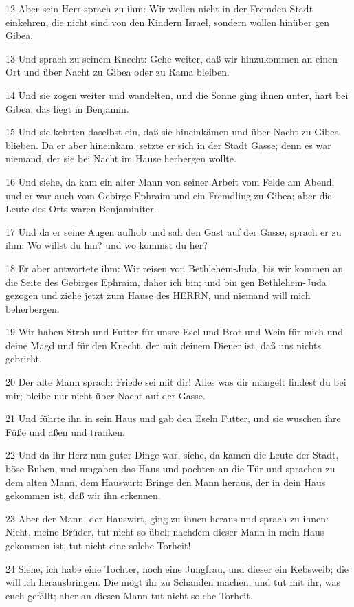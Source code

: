 \par 12 Aber sein Herr sprach zu ihm: Wir wollen nicht in der Fremden Stadt einkehren, die nicht sind von den Kindern Israel, sondern wollen hinüber gen Gibea.
\par 13 Und sprach zu seinem Knecht: Gehe weiter, daß wir hinzukommen an einen Ort und über Nacht zu Gibea oder zu Rama bleiben.
\par 14 Und sie zogen weiter und wandelten, und die Sonne ging ihnen unter, hart bei Gibea, das liegt in Benjamin.
\par 15 Und sie kehrten daselbst ein, daß sie hineinkämen und über Nacht zu Gibea blieben. Da er aber hineinkam, setzte er sich in der Stadt Gasse; denn es war niemand, der sie bei Nacht im Hause herbergen wollte.
\par 16 Und siehe, da kam ein alter Mann von seiner Arbeit vom Felde am Abend, und er war auch vom Gebirge Ephraim und ein Fremdling zu Gibea; aber die Leute des Orts waren Benjaminiter.
\par 17 Und da er seine Augen aufhob und sah den Gast auf der Gasse, sprach er zu ihm: Wo willst du hin? und wo kommst du her?
\par 18 Er aber antwortete ihm: Wir reisen von Bethlehem-Juda, bis wir kommen an die Seite des Gebirges Ephraim, daher ich bin; und bin gen Bethlehem-Juda gezogen und ziehe jetzt zum Hause des HERRN, und niemand will mich beherbergen.
\par 19 Wir haben Stroh und Futter für unsre Esel und Brot und Wein für mich und deine Magd und für den Knecht, der mit deinem Diener ist, daß uns nichts gebricht.
\par 20 Der alte Mann sprach: Friede sei mit dir! Alles was dir mangelt findest du bei mir; bleibe nur nicht über Nacht auf der Gasse.
\par 21 Und führte ihn in sein Haus und gab den Eseln Futter, und sie wuschen ihre Füße und aßen und tranken.
\par 22 Und da ihr Herz nun guter Dinge war, siehe, da kamen die Leute der Stadt, böse Buben, und umgaben das Haus und pochten an die Tür und sprachen zu dem alten Mann, dem Hauswirt: Bringe den Mann heraus, der in dein Haus gekommen ist, daß wir ihn erkennen.
\par 23 Aber der Mann, der Hauswirt, ging zu ihnen heraus und sprach zu ihnen: Nicht, meine Brüder, tut nicht so übel; nachdem dieser Mann in mein Haus gekommen ist, tut nicht eine solche Torheit!
\par 24 Siehe, ich habe eine Tochter, noch eine Jungfrau, und dieser ein Kebsweib; die will ich herausbringen. Die mögt ihr zu Schanden machen, und tut mit ihr, was euch gefällt; aber an diesen Mann tut nicht solche Torheit.
